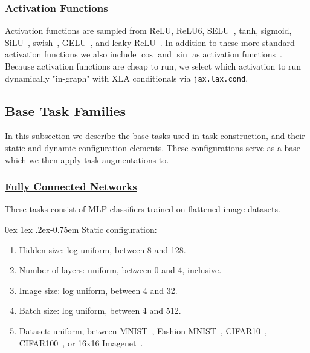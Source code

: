 \documentclass[11pt]{article}
\makeatletter
\renewcommand{\paragraph}{%
  \@startsection{paragraph}{4}%
  {\z@}{0ex \@plus 1ex \@minus .2ex}{-0.75em}%
  {\normalfont\normalsize\bfseries}%
}
\makeatother
\begin{document}
\subsubsection{{Activation Functions}}
Activation functions are sampled from ReLU, ReLU6, SELU~\citep{klambauer2017self}, tanh, sigmoid, SiLU~\citep{hendrycks2016gaussian}, swish~\citep{ramachandran2017searching}, GELU~\citep{hendrycks2016gaussian}, and leaky ReLU~\citep{maas2013rectifier}.
In addition to these more standard activation functions we also include $\cos$ and $\sin$ as activation functions~\citep{meronen2021periodic}.
Because activation functions are cheap to run, we select which activation to run dynamically "in-graph" with XLA conditionals via \texttt{jax.lax.cond}.
\label{app:tasks:act}

\subsection{Base Task Families} \label{app:base_task_families}
In this subsection we describe the base tasks used in task construction, and their static and dynamic configuration elements.
These configurations serve as a base which we then apply task-augmentations to.

\subsubsection{\href{https://github.com/google/learned_optimization/blob/4447601601f04e3dc7b1aecd7854d44526593752/learned_optimization/tasks/parametric/image_mlp.py}{Fully Connected Networks}} \label{mlp_task_sample_distribution}
These tasks consist of MLP classifiers trained on flattened image datasets.

\paragraph{Static configuration:}
\begin{enumerate}
    \item Hidden size: log uniform, between 8 and 128.
    \item Number of layers: uniform, between 0 and 4, inclusive.
    \item Image size: log uniform, between 4 and 32.
    \item Batch size: log uniform, between 4 and 512.
    \item Dataset: uniform, between MNIST~\citep{lecun1998mnist}, Fashion MNIST~\citep{xiao2017/online}, CIFAR10~\citep{Krizhevsky09learningmultiple}, CIFAR100~\citep{Krizhevsky09learningmultiple}, or 16x16 Imagenet~\citep{ILSVRC15}.
\end{enumerate}
\end{document}
